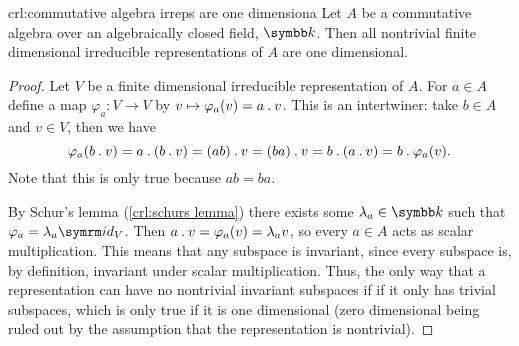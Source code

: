 \begin{crl}{}{crl:commutative algebra irreps are one dimensiona}
    Let \(A\) be a commutative algebra over an algebraically closed field, \(\field\).
    Then all nontrivial finite dimensional irreducible representations of \(A\) are one dimensional.
    \begin{proof}
        Let \(V\) be a finite dimensional irreducible representation of \(A\).
        For \(a \in A\) define a map \(\varphi_a \colon V \to V\) by \(v \mapsto \varphi_a(v) = a \mathbin{.} v\).
        This is an intertwiner: take \(b \in A\) and \(v \in V\), then we have
        \begin{equation}
            \varphi_a(b \mathbin{.} v) = a \mathbin{.} (b \mathbin{.} v) = (ab) \mathbin{.} v = (ba) \mathbin{.} v = b \mathbin{.} (a \mathbin{.} v) = b \mathbin{.} \varphi_a(v).
        \end{equation}
        Note that this is only true because \(ab = ba\).
        
        By Schur's lemma (\cref{crl:schurs lemma}) there exists some \(\lambda_a \in \field\) such that \(\varphi_a = \lambda_a \id_V\).
        Then \(a \mathbin{.} v = \varphi_a(v) = \lambda_a v\), so every \(a \in A\) acts as scalar multiplication.
        This means that any subspace is invariant, since every subspace is, by definition, invariant under scalar multiplication.
        Thus, the only way that a representation can have no nontrivial invariant subspaces if if it only has trivial subspaces, which is only true if it is one dimensional (zero dimensional being ruled out by the assumption that the representation is nontrivial).
    \end{proof}
\end{crl}

